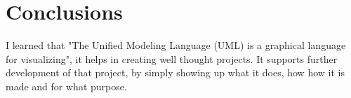 \section*{Conclusions}

I learned that "The Unified Modeling Language (UML) is a graphical language for visualizing", it helps in creating well thought projects. It supports further development of that project, by simply showing up what it does, how how it is made and for what purpose. 
\clearpage